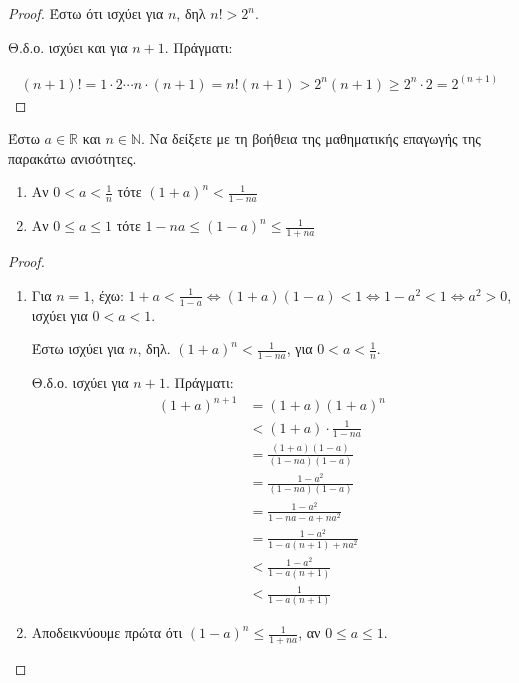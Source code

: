 \begin{multicols}{2}
\begin{enumerate}
\begin{proof}
      Έστω ότι ισχύει για $n$, δηλ $ n! >2^{n} $. 

      Θ.δ.ο. ισχύει και για $ n+1 $. Πράγματι:

      \begin{align*} (n+1)! = 1 \cdot 2 \cdots n \cdot (n+1)  
        =n!(n+1) > 2^{n}(n+1) \geq 2^{n}\cdot 2 = 2^{(n+1)}
      \end{align*}
    \end{proof}

  \item \textcolor{Col1}{Έστω $ a \in \mathbb{R} $ και $ n \in \mathbb{N}$.
      Να δείξετε με τη βοήθεια της μαθηματικής επαγωγής της 
      παρακάτω ανισότητες.
      \begin{enumerate}
        \item Αν $ 0<a< \frac{1}{n} $ τότε $ (1+a)^{n} < \frac{1}{1-na} $
        \item Αν $ 0 \leq a \leq 1$  τότε $ 1-na \leq (1-a)^{n} \leq
          \frac{1}{1+na} $
    \end{enumerate}}
    \begin{proof}
    \item {}
      \begin{enumerate}
        \item Για $ n=1 $, έχω: $ 1+a < \frac{1}{1-a} 
          \Leftrightarrow (1+a)(1-a) < 1 
          \Leftrightarrow 1-a^{2} <1 \Leftrightarrow a^{2} > 0  $,
          ισχύει για $ 0<a<1 $.

          Έστω ισχύει για $ n $, δηλ. $ (1+a)^{n} < \frac{1}{1-na}
          $, για $ 0 < a < \frac{1}{n} $.

          Θ.δ.ο. ισχύει για $ n+1 $. Πράγματι:
          \begin{align*}
            (1+a)^{n+1} &= (1+a)(1+a)^{n} \\
                        &< (1+a)\cdot \frac{1}{1-na} \\
                        &= \frac{(1+a)(1-a)}{(1-na)(1-a)} \\
                        &= \frac{1-a^{2}}{(1-na)(1-a)} \\ 
                        &= \frac{1-a^{2}}{1-na-a+na^{2}} \\
                        &= \frac{1-a^{2}}{1-a(n+1)+na^{2}} \\
                        &< \frac{1-a^{2}}{1-a(n+1)} \\
                        &< \frac{1}{1-a(n+1)} 
          \end{align*}
        \item Αποδεικνύουμε πρώτα ότι $ (1-a)^{n} \leq \frac{1}{1+na}$,
          αν $ 0 \leq a \leq 1 $.


\end{enumerate}
\end{proof}
\end{enumerate}
\end{multicols}
